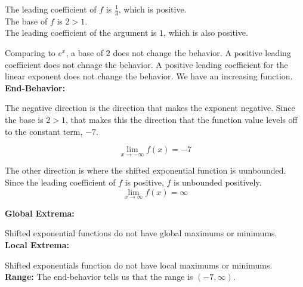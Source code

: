 \documentclass{ximera}
\begin{document}
\begin{example}
The leading coefficient of $f$ is $\frac{1}{3}$, which is positive. \\

The base of $f$ is $2 > 1$.\\

The leading coefficient of the argument is $1$, which is also positive.  



Comparing to $e^x$, a base of $2$ does not change the behavior. A positive leading coefficient does not chnage the behavior.  A positive leading coefficient for the linear exponent does not change the behavior.  We have an increasing function. \\






\textbf{End-Behavior:} 



The negative direction is the direction that makes the exponent negative.  Since the base is $2 > 1$, that makes this the direction that the function value levels off to the constant term, $-7$. 

\[
\lim\limits_{x \to -\infty} f(x) = -7
\]




The other direction is where the shifted exponential function is uunbounded.  Since the leading coefficient of $f$ is positive, $f$ is unbounded positively. \\



\[
\lim\limits_{x \to \infty} f(x) = \infty
\]







\textbf{Global Extrema:} 

Shifted exponential functions do not have global maximums or minimums. \\


\textbf{Local Extrema:} 

Shifted exponentials function do not have local maximums or minimums. \\



\textbf{Range:} The end-behavior tells us that the range is $(-7, \infty)$.





\end{example}
\end{document}
